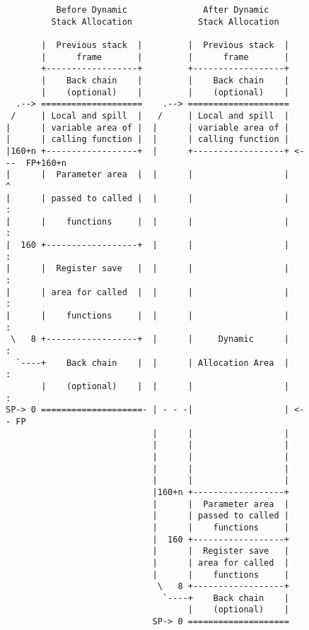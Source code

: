 \documentclass[english,11pt,twoside,toc=bib,toc=idx]{scrreprt}
\newif\ifSkipTikZ
\begin{document}
\begin{figure}
  \centering
  \ifSkipTikZ
\begin{verbatim}
          Before Dynamic               After Dynamic
         Stack Allocation             Stack Allocation

       |  Previous stack  |         |  Previous stack  |
       |      frame       |         |      frame       |
       +------------------+         +------------------+
       |    Back chain    |         |    Back chain    |
       |    (optional)    |         |    (optional)    |
  .--> ====================    .--> ====================
 /     | Local and spill  |   /     | Local and spill  |
|      | variable area of |  |      | variable area of |
|      | calling function |  |      | calling function |
|160+n +------------------+  |      +------------------+ <---  FP+160+n
|      |  Parameter area  |  |      |                  |     ^
|      | passed to called |  |      |                  |     :
|      |    functions     |  |      |                  |     :
|  160 +------------------+  |      |                  |     :
|      |  Register save   |  |      |                  |     :
|      | area for called  |  |      |                  |     :
|      |    functions     |  |      |                  |     :
 \   8 +------------------+  |      |     Dynamic      |     :
  `----+    Back chain    |  |      | Allocation Area  |     :
       |    (optional)    |  |      |                  |     :
SP-> 0 ====================- | - - -|                  | <-- FP
                             |      |                  |
                             |      |                  |
                             |      |                  |
                             |      |                  |
                             |      |                  |
                             |160+n +------------------+
                             |      |  Parameter area  |
                             |      | passed to called |
                             |      |    functions     |
                             |  160 +------------------+
                             |      |  Register save   |
                             |      | area for called  |
                             |      |    functions     |
                              \   8 +------------------+
                               `----+    Back chain    |
                                    |    (optional)    |
                             SP-> 0 ====================
\end{verbatim}
  \else

\end{figure}
\end{document}
